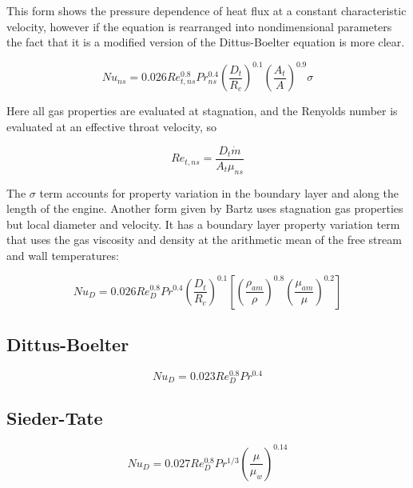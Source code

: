 \documentclass[11pt]{article}
\begin{document}
This form shows the pressure dependence of heat flux at a constant characteristic velocity, however if the equation is rearranged into nondimensional parameters the fact that it is a modified version of the Dittus-Boelter equation is more clear.

\begin{equation}
  Nu_{ns} = 0.026 Re_{t, ns}^{0.8} Pr_{ns}^{0.4} \left( \frac{D_t}{R_c} \right)^{0.1} \left( \frac{A_t}{A} \right)^{0.9} \sigma
\end{equation}

Here all gas properties are evaluated at stagnation, and the Renyolds number is evaluated at an effective throat velocity, so

\begin{equation}
  Re_{t, ns} = \frac{D_t \dot{m}}{A_t \mu_{ns}}
\end{equation}

The $\sigma$ term accounts for property variation in the boundary layer and along the length of the engine. Another form given by Bartz uses stagnation gas properties but local diameter and velocity. It has a boundary layer property variation term that uses the gas viscosity and density at the arithmetic mean of the free stream and wall temperatures:

\begin{equation}
  Nu_{D} = 0.026 Re_{D}^{0.8} Pr^{0.4} \left( \frac{D_t}{R_c} \right)^{0.1} \left[ \left( \frac{\rho_{am}}{\rho} \right)^{0.8} \left(\frac{\mu_{am}}{\mu} \right)^{0.2}\right]
\end{equation}


\subsection{Dittus-Boelter}


\begin{equation}
  Nu_{D} = 0.023 Re_{D}^{0.8} Pr^{0.4}
\end{equation}

\subsection{Sieder-Tate}

\begin{equation}
  Nu_{D} = 0.027 Re_{D}^{0.8} Pr^{1/3} \left( \frac{\mu}{\mu_w} \right)^{0.14}
\end{equation}
\end{document}
